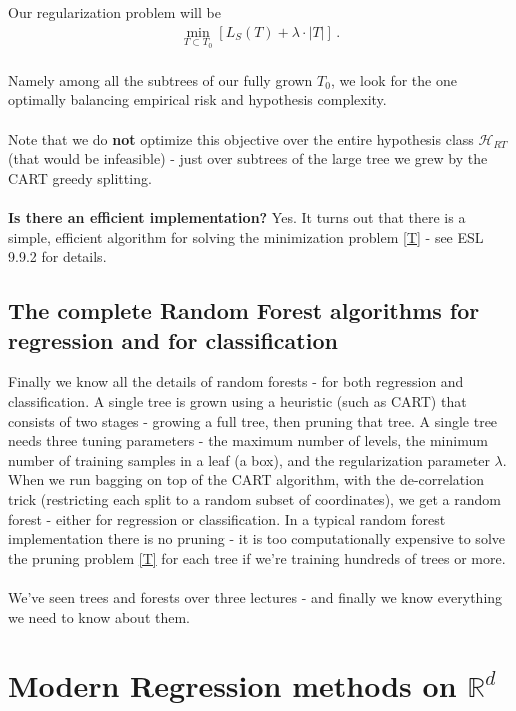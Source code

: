 \documentclass[11pt]{article}
\newcommand{\R}{\ensuremath{\mathbb{R}}}
\newcommand{\Hc}{\mathcal{H}}
\begin{document}
    Our regularization problem will be
    \begin{eqnarray} \label{T}
      \min_{T\subset T_0} \left[L_S(T) + \lambda\cdot |T|\right]\,.
    \end{eqnarray}
~\\
Namely among all the subtrees of our fully grown $T_0$, we look for the
      one optimally balancing empirical risk and hypothesis complexity.
\\~\\
Note that we do {\bf not} optimize this objective over the entire hypothesis
      class $\Hc_{RT}$ (that would be infeasible) - just over subtrees of the large tree we grew by the CART 
      greedy splitting. 
\\~\\
      {\bf Is there an efficient implementation?} Yes. It turns out that there
      is a simple, efficient algorithm for solving the minimization problem
      \eqref{T} - see ESL 9.9.2 for details. 

    \subsection{The complete Random Forest algorithms for regression and for
    classification}

    Finally we know all the details  of random forests - for both regression and
    classification. A single tree is grown using a heuristic (such as CART) that
    consists of two stages - growing a full tree, then pruning that tree. A
    single tree needs three tuning parameters - the maximum number of levels,
    the minimum number of training samples in a leaf (a box), and the
    regularization parameter $\lambda$. When we run bagging on top of the CART
    algorithm, with the de-correlation trick (restricting each split to a random
    subset of coordinates), we get a random forest - either for regression or
    classification. In a typical random forest implementation there is no
    pruning - it is too computationally expensive to solve the pruning 
    problem \eqref{T} for each tree if we're training hundreds of trees or more.
\\~\\
    We've seen trees and forests over three lectures - and finally we know
everything we need to know about them.


\section{Modern Regression methods on $\R^d$}
\end{document}
